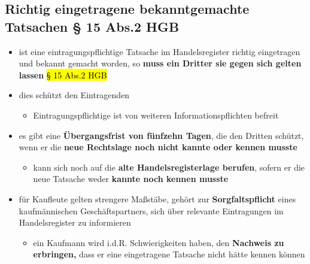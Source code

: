 \documentclass[a4paper, 10pt]{article}
\begin{document}
\subsection{Richtig eingetragene bekanntgemachte Tatsachen § 15 Abs.2 HGB}
\begin{itemize}
    \item ist eine eintragungspflichtige Tatsache im Handelsregister richtig eingetragen und bekannt gemacht worden, so \textbf{muss ein Dritter sie gegen sich gelten lassen} \hl{§ 15 Abs.2 HGB}
    \item dies schützt den Eintragenden
    \begin{itemize}
        \item Eintragungspflichtige ist von weiteren Informationspflichten befreit
    \end{itemize}

    \item es gibt eine \textbf{Übergangsfrist von fünfzehn Tagen}, die den Dritten schützt, wenn er die \textbf{neue Rechtslage noch nicht kannte oder kennen musste}
    \begin{itemize}
        \item kann sich noch auf die \textbf{alte Handelsregisterlage berufen}, sofern er die neue Tatsache weder \textbf{kannte noch kennen musste}
    \end{itemize}

    \item für Kaufleute gelten strengere Maßstäbe, gehört zur \textbf{Sorgfaltspflicht} eines kaufmännischen Geschäftspartners, sich über relevante Eintragungen im Handelsregister zu informieren
    \begin{itemize}
        \item ein Kaufmann wird i.d.R. Schwierigkeiten haben, den \textbf{Nachweis zu erbringen,} dass er eine eingetragene Tatsache nicht hätte kennen können
    \end{itemize}
\end{itemize}
\end{document}
